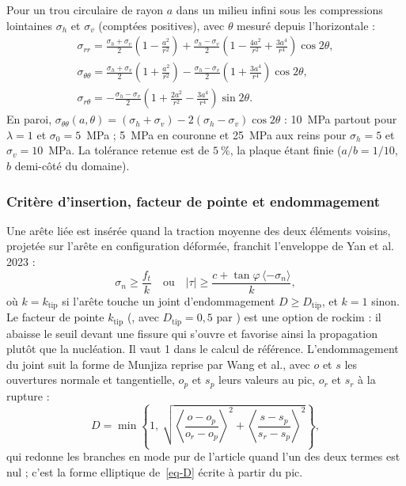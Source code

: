 Pour un trou circulaire de rayon $a$ dans un milieu infini sous les compressions lointaines $\sigma_h$ et $\sigma_v$ (comptées positives), avec $\theta$ mesuré depuis l'horizontale :
\begin{gather}
\sigma_{rr} = \frac{\sigma_h + \sigma_v}{2}\left(1 - \frac{a^2}{r^2}\right) + \frac{\sigma_h - \sigma_v}{2}\left(1 - \frac{4a^2}{r^2} + \frac{3a^4}{r^4}\right)\cos 2\theta, \\
\sigma_{\theta\theta} = \frac{\sigma_h + \sigma_v}{2}\left(1 + \frac{a^2}{r^2}\right) - \frac{\sigma_h - \sigma_v}{2}\left(1 + \frac{3a^4}{r^4}\right)\cos 2\theta, \\
\sigma_{r\theta} = -\frac{\sigma_h - \sigma_v}{2}\left(1 + \frac{2a^2}{r^2} - \frac{3a^4}{r^4}\right)\sin 2\theta .
\end{gather}
En paroi, $\sigma_{\theta\theta}(a, \theta) = (\sigma_h + \sigma_v) - 2(\sigma_h - \sigma_v)\cos 2\theta$ : 10~MPa partout pour $\lambda = 1$ et $\sigma_0 = 5$~MPa ; 5~MPa en couronne et 25~MPa aux reins pour $\sigma_h = 5$ et $\sigma_v = 10$~MPa. La tolérance retenue est de $5~\%$, la plaque étant finie ($a/b = 1/10$, $b$ demi-côté du domaine).

\subsubsection{Critère d'insertion, facteur de pointe et endommagement}

Une arête liée est insérée quand la traction moyenne des deux éléments voisins, projetée sur l'arête en configuration déformée, franchit l'enveloppe de Yan et al. 2023 :
\begin{equation}
\sigma_n \geq \frac{f_t}{k} \quad \text{ou} \quad |\tau| \geq \frac{c + \tan\varphi\,\langle -\sigma_n\rangle}{k},
\label{eq-tun-insertion}
\end{equation}
où $k = k_\text{tip}$ si l'arête touche un joint d'endommagement $D \geq D_\text{tip}$, et $k = 1$ sinon. Le facteur de pointe $k_\text{tip}$ (, avec $D_\text{tip} = 0{,}5$ par ) est une option de rockim : il abaisse le seuil devant une fissure qui s'ouvre et favorise ainsi la propagation plutôt que la nucléation. Il vaut 1 dans le calcul de référence. L'endommagement du joint suit la forme de Munjiza reprise par Wang et al., avec $o$ et $s$ les ouvertures normale et tangentielle, $o_p$ et $s_p$ leurs valeurs au pic, $o_r$ et $s_r$ à la rupture :
\begin{equation}
D = \min\left\{1,\ \sqrt{\left\langle\frac{o - o_p}{o_r - o_p}\right\rangle^2 + \left\langle\frac{s - s_p}{s_r - s_p}\right\rangle^2}\right\},
\label{eq-tun-D}
\end{equation}
qui redonne les branches en mode pur de l'article quand l'un des deux termes est nul ; c'est la forme elliptique de~\eqref{eq-D} écrite à partir du pic.

